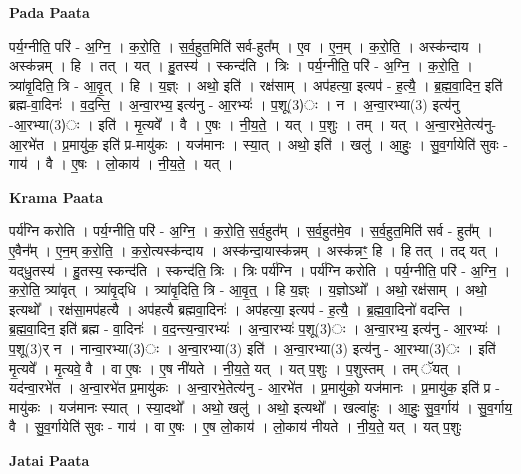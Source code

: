 \documentclass[17pt]{extarticle}
\begin{document}
\textbf{Pada Paata} \newline

पर्य॒ग्नीति॒ परि॑ - अ॒ग्नि॒ । क॒रो॒ति॒ । स॒र्व॒हुत॒मिति॑ सर्व-हुत᳚म् । ए॒व । ए॒न॒म् । क॒रो॒ति॒ । अस्क॑न्दाय । अस्क॑न्नम् । हि । तत् । यत् । हु॒तस्य॑ । स्कन्द॑ति । त्रिः । पर्य॒ग्नीति॒ परि॑ - अ॒ग्नि॒ । क॒रो॒ति॒ । त्र्या॑वृ॒दिति॒ त्रि - आ॒वृ॒त् । हि । य॒ज्ञ्ः । अथो॒ इति॑ । रक्ष॑साम् । अप॑हत्या॒ इत्यप॑ - ह॒त्यै॒ । ब्र॒ह्म॒वा॒दिन॒ इति॑ ब्रह्म-वा॒दिनः॑ । व॒द॒न्ति॒ । अ॒न्वा॒रभ्य॒ इत्य॑नु - आ॒रभ्यः॑ । प॒शू(3)ः । न । अ॒न्वा॒रभ्या(3) इत्य॑नु -आ॒रभ्या(3)ः । इति॑ । मृ॒त्यवे᳚ । वै । ए॒षः । नी॒य॒ते॒ । यत् ।  प॒शुः । तम् । यत् । अ॒न्वा॒रभे॒तेत्य॑नु-आ॒रभे॑त । प्र॒मायु॑क॒ इति॑ प्र-मायु॑कः । यज॑मानः । स्या॒त् । अथो॒ इति॑ । खलु॑ । आ॒हुः॒ । सु॒व॒र्गायेति॑ सुवः - गाय॑ । वै । ए॒षः । लो॒काय॑ । नी॒य॒ते॒ । यत् ।  \newline


\textbf{Krama Paata} \newline

पर्य॑ग्नि करोति । पर्य॒ग्नीति॒ परि॑ - अ॒ग्नि॒ । क॒रो॒ति॒ स॒र्व॒हुत᳚म् । स॒र्व॒हुत॑मे॒व । स॒र्व॒हुत॒मिति॑ सर्व - हुत᳚म् । ए॒वैन᳚म् । ए॒न॒म् क॒रो॒ति॒ । क॒रो॒त्यस्क॑न्दाय । अस्क॑न्दा॒यास्क॑न्नम् । अस्क॑न्नꣳ॒॒ हि । हि तत् । तद् यत् । यद्‍धु॒तस्य॑ । हु॒तस्य॒ स्कन्द॑ति । स्कन्द॑ति॒ त्रिः । त्रिः पर्य॑ग्नि । पर्य॑ग्नि करोति । पर्य॒ग्नीति॒ परि॑ - अ॒ग्नि॒ । क॒रो॒ति॒ त्र्या॑वृत् । त्र्या॑वृ॒द्‌धि । त्र्या॑वृ॒दिति॒ त्रि - आ॒वृ॒त्॒ । हि य॒ज्ञ्ः । य॒ज्ञोऽथो᳚ । अथो॒ रक्ष॑साम् । अथो॒ इत्यथो᳚ । रक्ष॑सा॒मप॑हत्यै । अप॑हत्यै ब्रह्मवा॒दिनः॑ । अप॑हत्या॒ इत्यप॑ - ह॒त्यै॒ । ब्र॒ह्म॒वा॒दिनो॑ वदन्ति । ब्र॒ह्म॒वा॒दिन॒ इति॑ ब्रह्म - वा॒दिनः॑ । व॒द॒न्त्य॒न्वा॒रभ्यः॑ । अ॒न्वा॒रभ्यः॑ प॒शू(3)ः । अ॒न्वा॒रभ्य॒ इत्य॑नु - आ॒रभ्यः॑ । प॒शू(3)र् न । नान्वा॒रभ्या(3)ः । अ॒न्वा॒रभ्या(3) इति॑ । अ॒न्वा॒रभ्या(3) इत्य॑नु - आ॒रभ्या(3)ः । इति॑ मृ॒त्यवे᳚ । मृ॒त्यवे॒ वै । वा ए॒षः । ए॒ष नी॑यते । नी॒य॒ते॒ यत् । यत् प॒शुः । प॒शुस्तम् । तम् ॅयत् । यद॑न्वा॒रभे॑त । अ॒न्वा॒रभे॑त प्र॒मायु॑कः । अ॒न्वा॒रभे॒तेत्य॑नु - आ॒रभे॑त । प्र॒मायु॑को॒ यज॑मानः । प्र॒मायु॑क॒ इति॑ प्र - मायु॑कः । यज॑मानः स्यात् । स्या॒दथो᳚ । अथो॒ खलु॑ । अथो॒ इत्यथो᳚ । खल्वा॑हुः । आ॒हुः॒ सु॒व॒र्गाय॑ । सु॒व॒र्गाय॒ वै । सु॒व॒र्गायेति॑ सुवः - गाय॑ । वा ए॒षः । ए॒ष लो॒काय॑ । लो॒काय॑ नीयते । नी॒य॒ते॒ यत् । यत् प॒शुः \newline

\textbf{Jatai Paata} \newline
\end{document}
